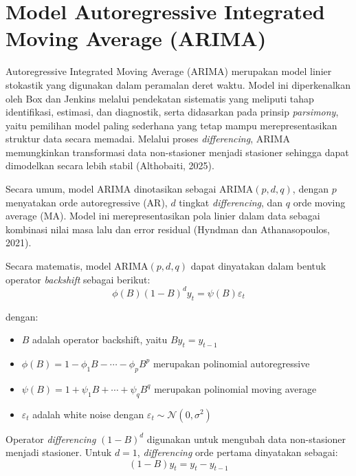 \section{Model Autoregressive Integrated Moving Average (ARIMA)}

\noindent Autoregressive Integrated Moving Average (ARIMA) merupakan model linier stokastik yang digunakan dalam peramalan deret waktu. Model ini diperkenalkan oleh Box dan Jenkins melalui pendekatan sistematis yang meliputi tahap identifikasi, estimasi, dan diagnostik, serta didasarkan pada prinsip \textit{parsimony}, yaitu pemilihan model paling sederhana yang tetap mampu merepresentasikan struktur data secara memadai. Melalui proses \textit{differencing}, ARIMA memungkinkan transformasi data non-stasioner menjadi stasioner sehingga dapat dimodelkan secara lebih stabil (Althobaiti, 2025).

Secara umum, model ARIMA dinotasikan sebagai ARIMA$(p,d,q)$, dengan $p$ menyatakan orde autoregressive (AR), $d$ tingkat \textit{differencing}, dan $q$ orde moving average (MA). Model ini merepresentasikan pola linier dalam data sebagai kombinasi nilai masa lalu dan error residual (Hyndman dan Athanasopoulos, 2021).

Secara matematis, model ARIMA$(p,d,q)$ dapat dinyatakan dalam bentuk operator \textit{backshift }sebagai berikut:
\begin{equation}
    \phi(B)(1 - B)^d y_t = \psi(B)\varepsilon_t
    \label{eq:arima_general}
\end{equation}

\noindent dengan:
\begin{itemize}
    \item $B$ adalah operator backshift, yaitu $B y_t = y_{t-1}$
    \item $\phi(B) = 1 - \phi_1 B - \cdots - \phi_p B^p$ merupakan polinomial autoregressive
    \item $\psi(B) = 1 + \psi_1 B + \cdots + \psi_q B^q$ merupakan polinomial moving average
    \item $\varepsilon_t$ adalah white noise dengan $\varepsilon_t \sim \mathcal{N}(0, \sigma^2)$
\end{itemize}

Operator \textit{differencing} $(1 - B)^d$ digunakan untuk mengubah data non-stasioner menjadi stasioner. Untuk $d=1$, \textit{differencing} orde pertama dinyatakan sebagai:
\begin{equation}
    (1 - B)y_t = y_t - y_{t-1}
    \label{eq:first_diff}
\end{equation}

